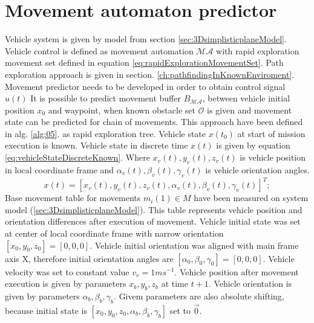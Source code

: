 \section{Movement automaton predictor}\label{ch:movementAutomatonPredictor}
\noindent Vehicle system is given by model from section \ref{sec:3DsimplisticplaneModel}. Vehicle control is defined as movement automation $\mathscr{MA}$ with rapid exploration movement set defined in equation \ref{eq:rapidExplorationMovementSet}. Path exploration approach is given in section. 
\ref{ch:pathfindingInKnownEnviroment}. Movement predictor needs to be developed in order to obtain control signal $u(t)$ It is possible to predict movement buffer $B_{\mathscr{MA}}$, between vehicle initial position $x_0$ and waypoint, when known obstacle set $\mathscr{O}$ is given and movement state can be predicted for chain of movements. This approach have been defined in alg. \ref{alg:05}. as rapid exploration tree. Vehicle state $x(t_0)$ at start of mission execution is known. Vehicle state in discrete time $x(t)$ is given by equation \ref{eq:vehicleStateDiscreteKnown}. Where $x_v(t),y_v(t),z_v(t)$ is vehicle position in local coordinate frame and $\alpha_v(t),\beta_v(t),\gamma_v(t)$ is vehicle orientation angles.
\begin{equation}\label{eq:vehicleStateDiscreteKnown}
    x(t) = [x_v(t),y_v(t),z_v(t),\alpha_v(t),\beta_v(t),\gamma_v(t)]^T;
\end{equation}
Base movement table for movements $m_i(1)\in M$ have been measured on system model (\ref{sec:3DsimplisticplaneModel}). This table represents vehicle position and orientation differences after execution of movement. Vehicle initial state was set at center of local coordinate frame with narrow orientation $[x_0,y_0,z_0]=[0,0,0]$. Vehicle initial orientation was aligned with main frame axis X, therefore initial orientation angles are $[\alpha_0,\beta_0,\gamma_0] = [0,0,0]$. Vehicle velocity was set to constant value $v_v = 1 ms^{-1}$. Vehicle position after movement execution is given by parameters $x_b,y_b,z_b$ at time $t+1$. Vehicle orientation is given by parameters $\alpha_b,\beta_b,\gamma_b$. Givem parameters are also absolute shifting, because initial state is $[x_0,y_0,z_0,\alpha_b,\beta_b,\gamma_b]$ set to $\vec{0}$.
